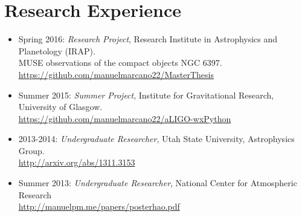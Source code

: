 \documentclass[letterpaper,10pt]{article}
\begin{document}

\section*{Research Experience}




\begin{itemize}[label=$\blacktriangleright$]
        \item Spring 2016: \emph{Research Project}, Research Institute in Astrophysics and Planetology (IRAP).\\
                MUSE observations of the compact objects NGC 6397. \url{https://github.com/manuelmarcano22/MasterThesis} 
                
\end{itemize}
                



\begin{itemize}[label=$\blacktriangleright$]
\item Summer 2015: \emph{Summer Project}, Institute for Gravitational Research, University of Glasgow.\\
\url{https://github.com/manuelmarcano22/aLIGO-wxPython}
\end{itemize}



\begin{itemize}[label=$\blacktriangleright$]
  \item 2013-2014: \emph{Undergraduate Researcher}, Utah State University, Astrophysics Group.  \\
  \url{http://arxiv.org/abs/1311.3153}
  \end{itemize}

\begin{itemize}[label=$\blacktriangleright$]
  \item Summer 2013: \emph{Undergraduate Researcher}, National Center for Atmospheric Research \\
\url{http://manuelpm.me/papers/posterhao.pdf}
  \end{itemize}
\end{document}
